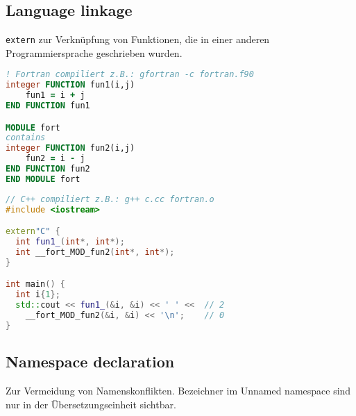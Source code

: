 \documentclass[10pt,twocolumn]{scrartcl}
\begin{document}
\subsection{Language linkage}

\lstinline|extern| zur Verknüpfung von Funktionen, die in einer anderen
Programmiersprache geschrieben wurden.

\begin{lstlisting}[language=fortran]
! Fortran compiliert z.B.: gfortran -c fortran.f90
integer FUNCTION fun1(i,j)
    fun1 = i + j
END FUNCTION fun1

MODULE fort
contains
integer FUNCTION fun2(i,j)
    fun2 = i - j
END FUNCTION fun2
END MODULE fort
\end{lstlisting}

\begin{lstlisting}[language=C++]
// C++ compiliert z.B.: g++ c.cc fortran.o
#include <iostream>

extern"C" {
  int fun1_(int*, int*);
  int __fort_MOD_fun2(int*, int*);
}

int main() {
  int i{1};
  std::cout << fun1_(&i, &i) << ' ' <<  // 2
    __fort_MOD_fun2(&i, &i) << '\n';    // 0
}
\end{lstlisting}

\subsection{Namespace declaration}

Zur Vermeidung von Namenskonflikten.
Bezeichner im Unnamed namespace sind nur in der Übersetzungseinheit sichtbar.
\end{document}
